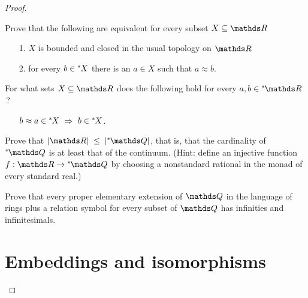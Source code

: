 \begin{proof}
\begin{exercise}\label{ex_bclosed_nstd}
  Prove that the following are equivalent for every subset $X\subseteq\RR$\nobreak
  \begin{itemize}
  \item[1.]  $X$ is bounded and closed in the usual topology on $\RR$
  \item[2.]  for every $b\in {}^*\kern-.2ex X$ there is an $a\in X$ such that $a\approx b$.
  \end{itemize}
\end{exercise}

\begin{exercise}\label{ex_clopen_nstd}
  For what sets $X \subseteq \RR$ does the following hold for every $a,b\in\nsR$\,?
  \begin{itemize}
  \item[] $b\approx a\in\ns X \ \IMP\ b\in\ns X$.
  \end{itemize}
\end{exercise}

\begin{exercise}\label{ex_card_nstd}
Prove that $|\RR|\;\le\;|\nsQ|$, that is, that the cardinality of $\nsQ$ is at least that of the continuum.
(Hint: define an injective function $f:\RR\to\nsQ$ by choosing a nonstandard rational in the monad of every standard real.) 
\end{exercise}

\begin{exercise}\label{ex_Q_nstd}
  Prove that every proper elementary extension of $\QQ$ in the language of rings plus a relation symbol for every subset of $\QQ$ has infinities and infinitesimals.
\end{exercise}


\section{Embeddings and isomorphisms}\label{Embeddings and isomorphisms}

\def\ceq#1#2#3{\parbox[b]{18ex}{$\displaystyle #1$}\parbox[b]{6ex}{\hfil$#2$}$\displaystyle #3$}


\end{proof}
